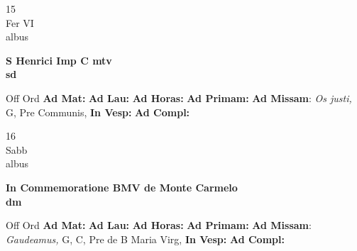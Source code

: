 \documentclass[10pt, openany]{book}
\begin{document}
    \begin{center}
        \begin{minipage}{3.5in}
            \vspace{2em}
            \begin{minipage}{0.5in}
                {\Huge 15} \\
                {\normalsize Fer VI} \\
                {\normalsize albus}
            \end{minipage}
            \begin{minipage}{3.0in}
                \textbf{ \large S Henrici Imp C mtv \\
                \textnormal{\normalsize sd}} \\ 
            \end{minipage}
            \begin{justify}Off Ord
                \textbf{Ad Mat: }
                \textbf{Ad Lau: }
                \textbf{Ad Horas: }
                \textbf{Ad Primam: }\textbf{Ad Missam}: \textit{Os justi,} G, Pre Communis,  
                \textbf{In Vesp: }
                \textbf{Ad Compl: }
            \end{justify}
        \end{minipage}
    \end{center}

    \begin{center}
        \begin{minipage}{3.5in}
            \vspace{2em}
            \begin{minipage}{0.5in}
                {\Huge 16} \\
                {\normalsize Sabb} \\
                {\normalsize albus}
            \end{minipage}
            \begin{minipage}{3.0in}
                \textbf{ \large In Commemoratione BMV de Monte Carmelo \\
                \textnormal{\normalsize dm}} \\ 
            \end{minipage}
            \begin{justify}Off Ord
                \textbf{Ad Mat: }
                \textbf{Ad Lau: }
                \textbf{Ad Horas: }
                \textbf{Ad Primam: }\textbf{Ad Missam}: \textit{Gaudeamus,} G, C, Pre  de B Maria Virg,  
                \textbf{In Vesp: }
                \textbf{Ad Compl: }
            \end{justify}
        \end{minipage}
    \end{center}
\end{document}
